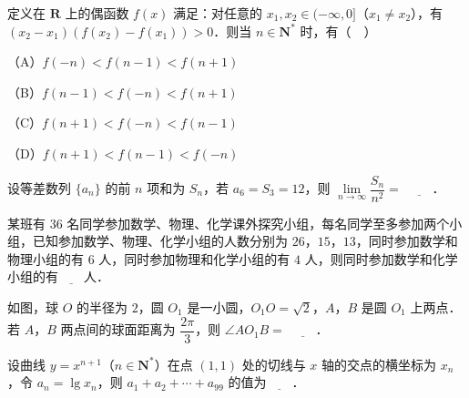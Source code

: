 \begin{question}
定义在 $\mathbf R$ 上的偶函数 $f(x)$ 满足：对任意的 $x_1,x_2\in(-\infty,0]$（$x_1\neq x_2$），有 $(x_2-x_1)(f(x_2)-f(x_1))>0$．则当 $n\in\mathbf N^*$ 时，有（　）

（A）$f(-n)<f(n-1)<f(n+1)$

（B）$f(n-1)<f(-n)<f(n+1)$

（C）$f(n+1)<f(-n)<f(n-1)$

（D）$f(n+1)<f(n-1)<f(-n)$

\end{question}

\begin{question}
设等差数列 $\{a_n\}$ 的前 $n$ 项和为 $S_n$，若 $a_6=S_3=12$，则 $\lim\limits_{n\to\infty}\dfrac{S_n}{n^2}=$ $\underline{\qquad}$．

\end{question}
\begingroup
\renewenvironment{question}{\Needspace{0.5\textheight}}{}
\begin{question}
某班有 $36$ 名同学参加数学、物理、化学课外探究小组，每名同学至多参加两个小组，已知参加数学、物理、化学小组的人数分别为 $26$，$15$，$13$，同时参加数学和物理小组的有 $6$ 人，同时参加物理和化学小组的有 $4$ 人，则同时参加数学和化学小组的有$\underline{\qquad}$人．

\Needspace{0.4\textheight}
\end{question}
\endgroup
\begin{question}
如图，球 $O$ 的半径为 $2$，圆 $O_1$ 是一小圆，$O_1O=\sqrt2$，$A$，$B$ 是圆 $O_1$ 上两点．若 $A$，$B$ 两点间的球面距离为 $\dfrac{2\pi}3$，则 $\angle AO_1B=$ $\underline{\qquad}$．
\nopagebreak[4]
\begin{center}\end{center}
\nopagebreak[4]
\end{question}
\begin{question}
设曲线 $y=x^{n+1}$（$n\in\mathbf N^*$）在点 $(1,1)$ 处的切线与 $x$ 轴的交点的横坐标为 $x_n$，令 $a_n=\lg x_n$，则 $a_1+a_2+\cdots+a_{99}$ 的值为$\underline{\qquad}$．

\end{question}


